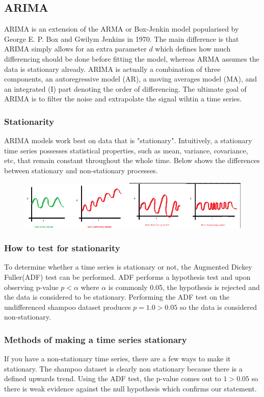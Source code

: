 \documentclass{article}
\begin{document}
  \subsection{ARIMA}
    ARIMA is an extension of the ARMA or Box-Jenkin model popularised by George E. P. Box and Gwilym Jenkins in 1970. The main difference is that ARIMA simply allows for an extra parameter $d$ which defines how much differencing should be done before fitting the model, whereas ARMA assumes the data is stationary already. 
    ARIMA is actually a combination of three components, an autoregressive model (AR), a moving averages model (MA), and an integrated (I) part denoting the order of differencing. The ultimate goal of ARIMA is to filter the noise and extrapolate the signal wihtin a time series.
  
  \subsubsection{Stationarity}
    ARIMA models work best on data that is "stationary". Intuitively, a stationary time series possesses statistical properties, such as mean, variance, covariance, etc, that remain constant throughout the whole time.
    Below shows the differences between stationary and non-stationary processes.
    \begin{figure}[H]
      \centering
      \includegraphics[scale=0.8]{stationary_time_series.png}
    \end{figure}

  \subsubsection{How to test for stationarity}
    To determine whether a time series is stationary or not, the Augmented Dickey Fuller(ADF) test can be performed. ADF performs a hypothesis test and upon observing p-value $p < \alpha$ where $\alpha$ is commonly 0.05, the hypothesis is rejected and the data is considered to be stationary. Performing the ADF test on the undifferenced shampoo dataset produces $p=1.0>0.05$ so the data is considered non-stationary.

  \subsubsection{Methods of making a time series stationary}
    If you have a non-stationary time series, there are a few ways to make it stationary. The shampoo dataset is clearly non stationary because there is a defined upwards trend. Using the ADF test, the p-value comes out to $1>0.05$ so there is weak evidence against the null hypothesis which confirms our statement.
\end{document}
